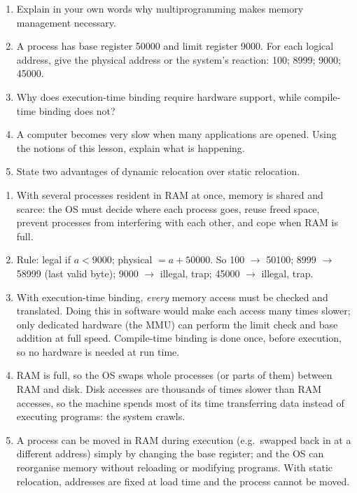 \documentclass[11pt]{article}
\begin{document}
\begin{exercice}
\begin{enumerate}
\item Explain in your own words why multiprogramming makes memory management necessary.
\item A process has base register 50000 and limit register 9000. For each logical address, give the physical address or the system's reaction: 100; 8999; 9000; 45000.
\item Why does execution-time binding require hardware support, while compile-time binding does not?
\item A computer becomes very slow when many applications are opened. Using the notions of this lesson, explain what is happening.
\item State two advantages of dynamic relocation over static relocation.
\end{enumerate}
\end{exercice}

\begin{corrige}[Exercise 1]
\begin{enumerate}
\item With several processes resident in RAM at once, memory is shared and scarce: the OS must decide where each process goes, reuse freed space, prevent processes from interfering with each other, and cope when RAM is full.
\item Rule: legal if $a < 9000$; physical $= a + 50000$. So 100 $\to$ 50100; 8999 $\to$ 58999 (last valid byte); 9000 $\to$ illegal, trap; 45000 $\to$ illegal, trap.
\item With execution-time binding, \emph{every} memory access must be checked and translated. Doing this in software would make each access many times slower; only dedicated hardware (the MMU) can perform the limit check and base addition at full speed. Compile-time binding is done once, before execution, so no hardware is needed at run time.
\item RAM is full, so the OS swaps whole processes (or parts of them) between RAM and disk. Disk accesses are thousands of times slower than RAM accesses, so the machine spends most of its time transferring data instead of executing programs: the system crawls.
\item A process can be moved in RAM during execution (e.g.\ swapped back in at a different address) simply by changing the base register; and the OS can reorganise memory without reloading or modifying programs. With static relocation, addresses are fixed at load time and the process cannot be moved.
\end{enumerate}
\end{corrige}
\end{document}
